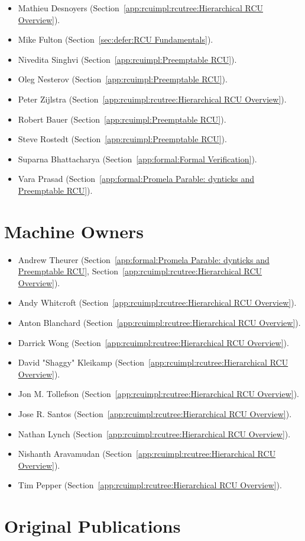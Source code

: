 \begin{itemize}
\item	Mathieu Desnoyers (Section~\ref{app:rcuimpl:rcutree:Hierarchical RCU Overview}).
\item	Mike Fulton (Section~\ref{sec:defer:RCU Fundamentals}).
\item	Nivedita Singhvi (Section~\ref{app:rcuimpl:Preemptable RCU}).
\item	Oleg Nesterov (Section~\ref{app:rcuimpl:Preemptable RCU}).
\item	Peter Zijlstra (Section~\ref{app:rcuimpl:rcutree:Hierarchical RCU Overview}).
\item	Robert Bauer (Section~\ref{app:rcuimpl:Preemptable RCU}).
\item	Steve Rostedt (Section~\ref{app:rcuimpl:Preemptable RCU}).
\item	Suparna Bhattacharya
	(Section~\ref{app:formal:Formal Verification}).
\item	Vara Prasad
	(Section~\ref{app:formal:Promela Parable: dynticks and Preemptable RCU}).
\end{itemize}

\section{Machine Owners}

\begin{itemize}
\item	Andrew Theurer
	(Section~\ref{app:formal:Promela Parable: dynticks and Preemptable RCU},
	Section~\ref{app:rcuimpl:rcutree:Hierarchical RCU Overview}).
\item	Andy Whitcroft (Section~\ref{app:rcuimpl:rcutree:Hierarchical RCU Overview}).
\item	Anton Blanchard (Section~\ref{app:rcuimpl:rcutree:Hierarchical RCU Overview}).
\item	Darrick Wong (Section~\ref{app:rcuimpl:rcutree:Hierarchical RCU Overview}).
\item	David "Shaggy" Kleikamp (Section~\ref{app:rcuimpl:rcutree:Hierarchical RCU Overview}).
\item	Jon M. Tollefson (Section~\ref{app:rcuimpl:rcutree:Hierarchical RCU Overview}).
\item	Jose R. Santos (Section~\ref{app:rcuimpl:rcutree:Hierarchical RCU Overview}).
\item	Nathan Lynch (Section~\ref{app:rcuimpl:rcutree:Hierarchical RCU Overview}).
\item	Nishanth Aravamudan (Section~\ref{app:rcuimpl:rcutree:Hierarchical RCU Overview}).
\item	Tim Pepper (Section~\ref{app:rcuimpl:rcutree:Hierarchical RCU Overview}).
\end{itemize}

\section{Original Publications}

\ListOriginalPublications
